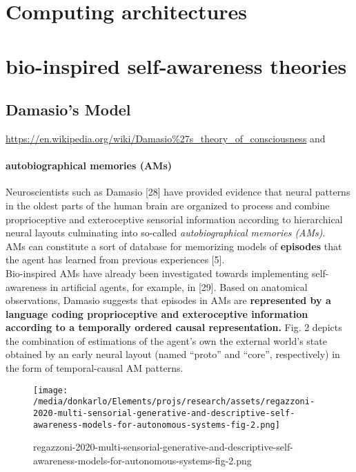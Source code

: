 \documentclass{article}
\begin{document}
	\section{Computing architectures}
		\cite{sanz-2009-systems-models-and-self-awareness-towards-architectural-models-of-consciousness}
	\section{bio-inspired self-awareness theories}
		\subsection{Damasio’s Model} \url{https://en.wikipedia.org/wiki/Damasio\%27s_theory_of_consciousness} and \citet{damasio-1999-the-feeling-of-what-happens-body-and-emotion-in-the-making-of-consciousness}
			\paragraph{autobiographical memories (AMs)} Neuroscientists such as Damasio \citet{regazzoni-2020-multi-sensorial-generative-and-descriptive-self-awareness-models-for-autonomous-systems}[28] have provided evidence that neural patterns in the oldest parts of the human brain are organized to process and combine proprioceptive and exteroceptive sensorial information according to hierarchical neural layouts culminating into so-called \emph{autobiographical memories (AMs)}. 
			\\
			AMs can constitute a sort of database for memorizing models of \textbf{episodes} that the agent has learned from previous experiences \citet{regazzoni-2020-multi-sensorial-generative-and-descriptive-self-awareness-models-for-autonomous-systems}[5]. 
			\\
			Bio-inspired AMs have already been investigated towards implementing self-awareness in
			artificial agents, for example, in \citet{regazzoni-2020-multi-sensorial-generative-and-descriptive-self-awareness-models-for-autonomous-systems}[29]. Based on anatomical observations, Damasio suggests that episodes in AMs are \textbf{represented by a language coding proprioceptive and exteroceptive information according to a temporally ordered causal representation.} Fig. 2 depicts the combination of estimations
			of the agent’s own the external world’s state obtained by an
			early neural layout (named “proto” and “core”, respectively)
			in the form of temporal-causal AM patterns.
			\begin{figure*}
				\centering
				\texttt{[image: /media/donkarlo/Elements/projs/research/assets/regazzoni-2020-multi-sensorial-generative-and-descriptive-self-awareness-models-for-autonomous-systems-fig-2.png]}
				\caption{regazzoni-2020-multi-sensorial-generative-and-descriptive-self-awareness-models-for-autonomous-systems-fig-2.png}
				\label{fig:regazzoni-2020-multi-sensorial-generative-and-descriptive-self-awareness-models-for-autonomous-systems-fig-2.png}
			\end{figure*}
\end{document}
